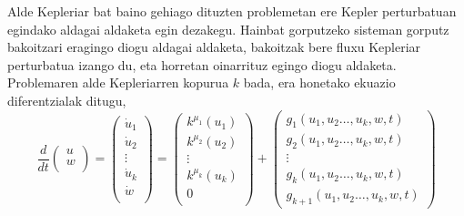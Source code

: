 Alde Kepleriar bat baino gehiago dituzten problemetan ere Kepler perturbatuan egindako aldagai aldaketa egin dezakegu. Hainbat gorputzeko sisteman gorputz bakoitzari eragingo diogu aldagai aldaketa, bakoitzak bere fluxu Kepleriar perturbatua izango du, eta horretan oinarrituz egingo diogu aldaketa. Problemaren alde Kepleriarren kopurua $k$ bada, era honetako ekuazio diferentzialak ditugu,
\begin{equation}
\label{eq: n-pertEDA}
\frac{d}{dt}\left(\begin{array}{c}
                u  \\
                w  \\
\end{array}\right)=
\left(\begin{array}{c}
                \dot{u}_1  \\
                \dot{u}_2  \\
                \vdots \\
                \dot{u}_k    \\
                \dot{w}      \\
\end{array}\right)=
\left(\begin{array}{c}
                k^{\mu_1}(u_1)  \\
                k^{\mu_2}(u_2)  \\
                \vdots \\
                k^{\mu_k}(u_k)  \\
                0      \\
\end{array}\right)+
\left(\begin{array}{c}
      g_1(u_1, u_2\dots, u_k,w,t) \\
      g_2(u_1, u_2\dots, u_k,w,t) \\
                \vdots \\
      g_k(u_1, u_2\dots, u_k,w,t)\\
      g_{k+1}(u_1, u_2\dots, u_k,w,t)
\end{array}\right)
\end{equation} 
 
